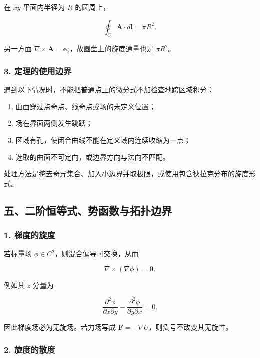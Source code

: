 在 \(xy\) 平面内半径为 \(R\) 的圆周上，

\[
\oint_C\mathbf A\cdot d\mathbf l
=\pi R^2.
\]

另一方面 \(\nabla\times\mathbf A=\mathbf e_z\)，故圆盘上的旋度通量也是
\(\pi R^2\)。

\subsubsection{3.
定理的使用边界}\label{m1:ux5b9aux7406ux7684ux4f7fux7528ux8fb9ux754c-1}

遇到以下情况时，不能把普通点上的微分式不加检查地跨区域积分：

\begin{enumerate}
\def\labelenumi{\arabic{enumi}.}
\tightlist
\item
  曲面穿过点奇点、线奇点或场的未定义位置；
\item
  场在界面两侧发生跳跃；
\item
  区域有孔，使闭合曲线不能在定义域内连续收缩为一点；
\item
  选取的曲面不可定向，或边界方向与法向不匹配。
\end{enumerate}

处理方法是挖去奇异集合、加入小边界并取极限，或使用包含狄拉克分布的旋度形式。

\subsection{五、二阶恒等式、势函数与拓扑边界}\label{m1:ux4e94ux4e8cux9636ux6052ux7b49ux5f0fux52bfux51fdux6570ux4e0eux62d3ux6251ux8fb9ux754c}

\subsubsection{1. 梯度的旋度}\label{m1:ux68afux5ea6ux7684ux65cbux5ea6}

若标量场 \(\phi\in C^2\)，则混合偏导可交换，从而

\[
\boxed{
\nabla\times(\nabla\phi)=\mathbf0
}.
\]

例如其 \(z\) 分量为

\[
\frac{\partial^2\phi}{\partial x\partial y}
-\frac{\partial^2\phi}{\partial y\partial x}
=0.
\]

因此梯度场必为无旋场。若力场写成
\(\mathbf F=-\nabla U\)，则负号不改变其无旋性。

\subsubsection{2. 旋度的散度}\label{m1:ux65cbux5ea6ux7684ux6563ux5ea6}

